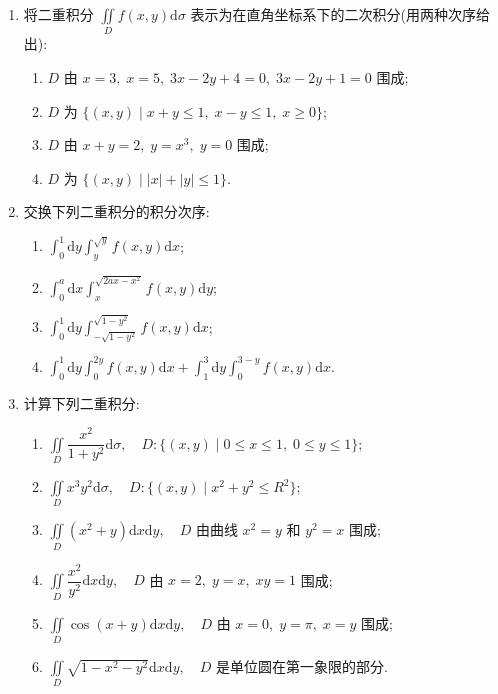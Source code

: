 \begin{enumerate}\setlength{\itemsep}{7pt}
    \item 将二重积分 $\displaystyle \iint\limits_{D}f(x, y)\text{d}\sigma$ 表示为在直角坐标系下的二次积分(用两种次序给出):
    \begin{enumerate}[(1)]\setlength{\itemsep}{5pt}\setlength{\topsep}{15pt}
        \item $D$ 由 $x=3,\;x=5,\;3x-2y+4=0,\;3x-2y+1=0$ 围成;
        \item $D$ 为 $\{(x, y)\mid x+y\leqslant 1,\;x-y\leqslant 1,\;x\geqslant 0\}$;
        \item $D$ 由 $x+y=2,\;y=x^3,\;y=0$ 围成;
        \item $D$ 为 $\{(x, y)\mid |x|+|y|\leqslant 1\}$.    
    \end{enumerate}

    \item 交换下列二重积分的积分次序:
    \begin{enumerate}[(1)]\setlength{\itemsep}{5pt}\setlength{\topsep}{15pt}
        \item $\displaystyle \int_0^1\text{d}y\int_{y}^{\sqrt{y}}f(x, y)\text{d}x$;
        \item $\displaystyle \int_0^a\text{d}x\int_{x}^{\sqrt{2ax-x^2}}f(x, y)\text{d}y$;
        \item $\displaystyle \int_0^1\text{d}y\int_{-\sqrt{1-y^2}}^{\sqrt{1-y^2}}f(x, y)\text{d}x$;
        \item $\displaystyle \int_0^1\text{d}y\int_0^{2y}f(x, y)\text{d}x+\int_1^3\text{d}y\int_0^{3-y}f(x, y)\text{d}x$.
    \end{enumerate}

    \item 计算下列二重积分:
    \begin{enumerate}[(1)]\setlength{\itemsep}{5pt}\setlength{\topsep}{15pt}
        \item $\displaystyle \iint\limits_{D}\dfrac{x^2}{1+y^2}\text{d}\sigma,\quad D : \{(x, y)\mid 0\leqslant x\leqslant 1,\;0\leqslant y\leqslant 1\}$;
        \item $\displaystyle \iint\limits_{D}x^3y^2\text{d}\sigma,\quad D : \{(x, y)\mid x^2+y^2\leqslant R^2\}$;
        \item $\displaystyle \iint\limits_{D}(x^2+y)\text{d}x\text{d}y,\quad D$ 由曲线 $x^2=y$ 和 $y^2=x$ 围成;
        \item $\displaystyle \iint\limits_{D}\dfrac{x^2}{y^2}\text{d}x\text{d}y,\quad D$ 由 $x=2,\;y=x,\;xy=1$ 围成;
        \item $\displaystyle \iint\limits_{D}\cos(x+y)\text{d}x\text{d}y,\quad D$ 由 $x=0,\;y=\pi,\;x=y$ 围成;
        \item $\displaystyle \iint\limits_{D}\sqrt{1-x^2-y^2}\text{d}x\text{d}y,\quad D$ 是单位圆在第一象限的部分.  
    \end{enumerate}


\end{enumerate}
